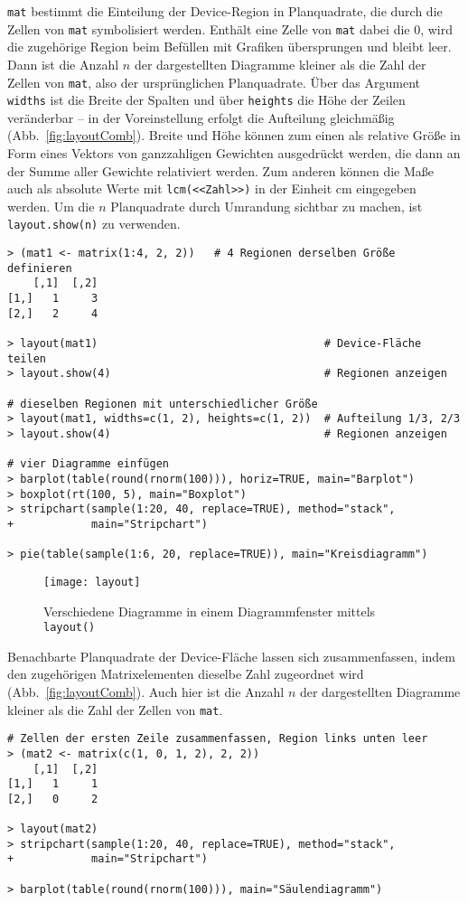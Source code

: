 \lstinline!mat! bestimmt die Einteilung der Device-Region in Planquadrate, die durch die Zellen von \lstinline!mat! symbolisiert werden. Enthält eine Zelle von \lstinline!mat! dabei die $0$, wird die zugehörige Region beim Befüllen mit Grafiken übersprungen und bleibt leer. Dann ist die Anzahl $n$ der dargestellten Diagramme kleiner als die Zahl der Zellen von \lstinline!mat!, also der ursprünglichen Planquadrate. Über das Argument \lstinline!widths! ist die Breite der Spalten und über \lstinline!heights! die Höhe der Zeilen veränderbar -- in der Voreinstellung erfolgt die Aufteilung gleichmäßig (Abb.\ \ref{fig:layoutComb}). Breite und Höhe können zum einen als relative Größe in Form eines Vektors von ganzzahligen Gewichten ausgedrückt werden, die dann an der Summe aller Gewichte relativiert werden. Zum anderen können die Maße auch als absolute Werte mit \lstinline!lcm(<<Zahl>>)! in der Einheit cm eingegeben werden. Um die $n$ Planquadrate durch Umrandung sichtbar zu machen, ist \lstinline!layout.show(n)! zu verwenden.
\begin{lstlisting}
> (mat1 <- matrix(1:4, 2, 2))   # 4 Regionen derselben Größe definieren
    [,1]  [,2]
[1,]   1     3
[2,]   2     4

> layout(mat1)                                   # Device-Fläche teilen
> layout.show(4)                                 # Regionen anzeigen

# dieselben Regionen mit unterschiedlicher Größe
> layout(mat1, widths=c(1, 2), heights=c(1, 2))  # Aufteilung 1/3, 2/3
> layout.show(4)                                 # Regionen anzeigen

# vier Diagramme einfügen
> barplot(table(round(rnorm(100))), horiz=TRUE, main="Barplot")
> boxplot(rt(100, 5), main="Boxplot")
> stripchart(sample(1:20, 40, replace=TRUE), method="stack",
+            main="Stripchart")

> pie(table(sample(1:6, 20, replace=TRUE)), main="Kreisdiagramm")
\end{lstlisting}

\begin{figure}[ht]
\centering
\texttt{[image: layout]}
\vspace*{-1em}
\caption{Verschiedene Diagramme in einem Diagrammfenster mittels \lstinline!layout()!}
\label{fig:layout}
\end{figure}

Benachbarte Planquadrate der Device-Fläche lassen sich zusammenfassen, indem den zugehörigen Matrixelementen dieselbe Zahl zugeordnet wird (Abb.\ \ref{fig:layoutComb}). Auch hier ist die Anzahl $n$ der dargestellten Diagramme kleiner als die Zahl der Zellen von \lstinline!mat!.
\begin{lstlisting}
# Zellen der ersten Zeile zusammenfassen, Region links unten leer
> (mat2 <- matrix(c(1, 0, 1, 2), 2, 2))
    [,1]  [,2]
[1,]   1     1
[2,]   0     2

> layout(mat2)
> stripchart(sample(1:20, 40, replace=TRUE), method="stack",
+            main="Stripchart")

> barplot(table(round(rnorm(100))), main="Säulendiagramm")
\end{lstlisting}

